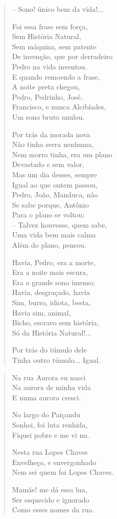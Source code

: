 \begin{verse}
-- Sono! único bem da vida!...

Foi essa frase sem força,\\
Sem História Natural,\\
Sem máquina, sem patente\\
De invenção, que por derradeiro\\
Pedro na vida inventou.\\
E quando remoendo a frase,\\
A noite preta chegou,\\
Pedro, Pedrinho, José,\\
Francisco, e nunca Alcibíades,\\
Um sono bruto anulou.

Por trás da morada nova\\
Não tinha serra nenhuma,\\
Nem morro tinha, era um plano\\
Devastado e sem valor,\\
Mas um dia desses, sempre\\
Igual ao que ontem passou,\\
Pedro, João, Manduca, não\\
Se sabe porque, Antônio\\
Para o plano se voltou:\\
-- Talvez houvesse, quem sabe,\\
Uma vida bem mais calma\\
Além do plano, pensou.

Havia, Pedro, era a morte,\\
Era a noite mais escura,\\
Era o grande sono imenso;\\
Havia, desgraçado, havia\\
Sim, burro, idiota, besta,\\
Havia sim, animal,\\
Bicho, escravo sem história,\\
Só da História Natural!...

Por trás do túmulo dele\\
Tinha outro túmulo... Igual.
\end{verse}

\pagebreak
{}

\begin{verse}
Na rua Aurora eu nasci\\
Na aurora de minha vida\\
E numa aurora cresci.

No largo do Paiçandu\\
Sonhei, foi luta renhida,\\
Fiquei pobre e me vi nu.

Nesta rua Lopes Chaves\\
Envelheço, e envergonhado\\
Nem sei quem foi Lopes Chaves.

Mamãe! me dá essa lua,\\
Ser esquecido e ignorado\\
Como esses nomes da rua.
\end{verse}

